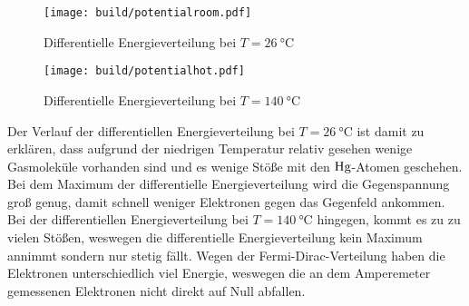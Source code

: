 \begin{figure}
    \centering
    \caption{Differentielle Energieverteilung bei $T = \SI{26}{\celsius}$}
    \label{fig:potentialroom}
    \texttt{[image: build/potentialroom.pdf]}
\end{figure}
\begin{figure}
    \centering
    \caption{Differentielle Energieverteilung bei $T = \SI{140}{\celsius}$}
    \label{fig:potentialhot}
    \texttt{[image: build/potentialhot.pdf]}
\end{figure}
Der Verlauf der differentiellen Energieverteilung bei $T = \SI{26}{\celsius}$ ist damit zu erklären, dass aufgrund der niedrigen Temperatur relativ gesehen wenige 
Gasmoleküle vorhanden sind und es wenige Stöße mit den $\ce{Hg}$-Atomen geschehen. Bei dem Maximum der differentielle Energieverteilung wird die Gegenspannung 
groß genug, damit schnell weniger Elektronen gegen das Gegenfeld ankommen.
Bei der differentiellen Energieverteilung bei $T = \SI{140}{\celsius}$ hingegen, kommt es zu zu vielen Stößen, weswegen die differentielle Energieverteilung kein
Maximum annimmt sondern nur stetig fällt.
Wegen der Fermi-Dirac-Verteilung haben die Elektronen unterschiedlich viel Energie, weswegen die an dem Amperemeter gemessenen Elektronen nicht direkt auf  
Null abfallen.
\FloatBarrier
